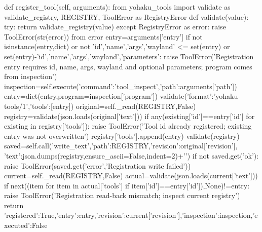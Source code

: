     def register_tool(self, arguments):
        from yohaku_tools import validate as validate_registry, REGISTRY, ToolError as RegistryError
        def validate(value):
            try:
                return validate_registry(value)
            except RegistryError as error:
                raise ToolError(str(error)) from error
        entry=arguments['entry']
        if not isinstance(entry,dict) or not {'id','name','args','wayland'} <= set(entry) or set(entry)-{'id','name','args','wayland','parameters'}:
            raise ToolError('Registration entry requires id, name, args, wayland and optional parameters; program comes from inspection')
        inspection=self.execute({'command':'tool_inspect','path':arguments['path']})
        entry=dict(entry,program=inspection['program'])
        validate({'format':'yohaku-tools/1','tools':[entry]})
        original=self._read(REGISTRY,False)
        registry=validate(json.loads(original['text']))
        if any(existing['id']==entry['id'] for existing in registry['tools']):
            raise ToolError('Tool id already registered; existing entry was not overwritten')
        registry['tools'].append(entry)
        validate(registry)
        saved=self.call('write_text',{'path':REGISTRY,'revision':original['revision'],
                                     'text':json.dumps(registry,ensure_ascii=False,indent=2)+'\n'})
        if not saved.get('ok'):
            raise ToolError(saved.get('error','Registration write failed'))
        current=self._read(REGISTRY,False)
        actual=validate(json.loads(current['text']))
        if next((item for item in actual['tools'] if item['id']==entry['id']),None)!=entry:
            raise ToolError('Registration read-back mismatch; inspect current registry')
        return {'registered':True,'entry':entry,'revision':current['revision'],'inspection':inspection,'executed':False}

